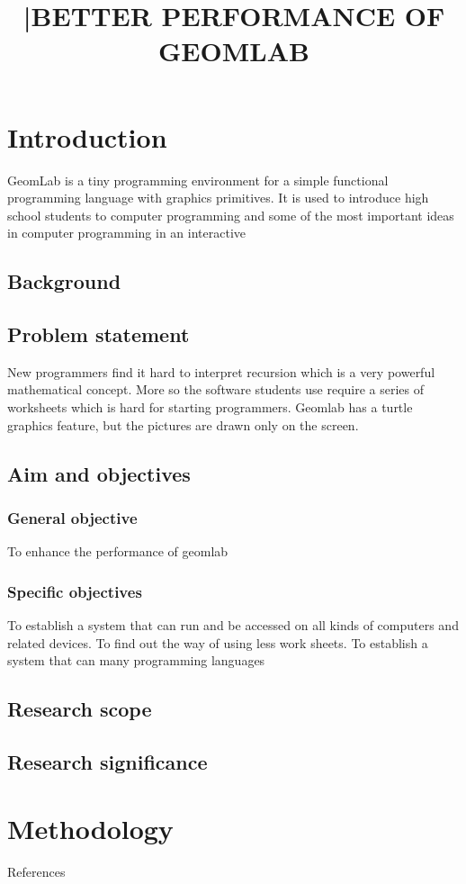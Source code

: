 \documentclass {article}
\begin{document}
\title {|BETTER PERFORMANCE OF GEOMLAB}
\maketitle
\section {Introduction}
GeomLab is a tiny programming environment for a simple functional programming language with graphics primitives.
 It is used to introduce high school students to computer programming and some of the most important ideas in computer programming in an interactive
\subsection {Background }


\subsection {Problem statement}
New programmers find it hard to interpret recursion which is a very powerful mathematical concept. More so the software students use require a series of worksheets which is hard for starting programmers. Geomlab has a turtle graphics feature, but the pictures are drawn only on the screen.
\subsection{ Aim and objectives}
\subsubsection{ General objective}
To enhance the performance of geomlab
 \subsubsection {Specific objectives}
To establish a system that can run and be accessed on all kinds of computers and related devices.
\newline To find out the way of using less work sheets.
\newline To establish a system that can many programming languages

\subsection {Research scope}
\subsection {Research significance}
\section{ Methodology}
{ References}
\end{document}
